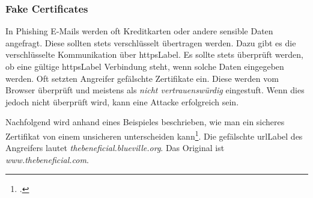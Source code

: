 \subsubsection{Fake Certificates}
In Phishing E-Mails werden oft Kreditkarten oder andere sensible Daten angefragt. Diese sollten stets verschlüsselt übertragen werden. Dazu gibt es die verschlüsselte Kommunikation über \Gls{httpsLabel}. Es sollte stets überprüft werden, ob eine gültige \Gls{httpsLabel} Verbindung steht, wenn solche Daten eingegeben werden. Oft setzten Angreifer gefälschte Zertifikate ein. Diese werden vom Browser überprüft und meistens als \textit{nicht vertrauenswürdig} eingestuft. Wenn dies jedoch nicht überprüft wird, kann eine Attacke erfolgreich sein.

Nachfolgend wird anhand eines Beispieles beschrieben, wie man ein sicheres Zertifikat von einem unsicheren unterscheiden kann\footcite{Phishing_and_Certificates_2015-05-23}. Die gefälschte \Gls{urlLabel} des Angreifers lautet \textit{thebeneficial.blueville.org}. Das Original ist \textit{www.thebeneficial.com}.

